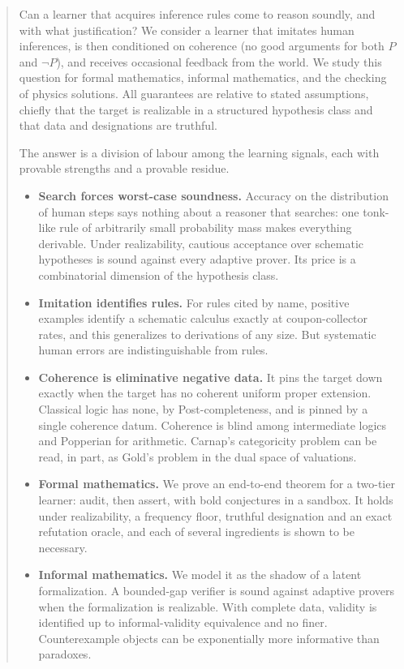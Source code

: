 \begin{abstract}
\noindent Can a learner that acquires inference rules come to reason soundly, and with what justification? We consider a learner that imitates human inferences, is then conditioned on coherence (no good arguments for both $P$ and $\neg P$), and receives occasional feedback from the world. We study this question for formal mathematics, informal mathematics, and the checking of physics solutions. All guarantees are relative to stated assumptions, chiefly that the target is realizable in a structured hypothesis class and that data and designations are truthful.

The answer is a division of labour among the learning signals, each with provable strengths and a provable residue.
\begin{itemize}
\item \textbf{Search forces worst-case soundness.} Accuracy on the distribution of human steps says nothing about a reasoner that searches: one tonk-like rule of arbitrarily small probability mass makes everything derivable. Under realizability, cautious acceptance over schematic hypotheses is sound against every adaptive prover. Its price is a combinatorial dimension of the hypothesis class.
\item \textbf{Imitation identifies rules.} For rules cited by name, positive examples identify a schematic calculus exactly at coupon-collector rates, and this generalizes to derivations of any size. But systematic human errors are indistinguishable from rules.
\item \textbf{Coherence is eliminative negative data.} It pins the target down exactly when the target has no coherent uniform proper extension. Classical logic has none, by Post-completeness, and is pinned by a single coherence datum. Coherence is blind among intermediate logics and Popperian for arithmetic. Carnap's categoricity problem can be read, in part, as Gold's problem in the dual space of valuations.
\item \textbf{Formal mathematics.} We prove an end-to-end theorem for a two-tier learner: audit, then assert, with bold conjectures in a sandbox. It holds under realizability, a frequency floor, truthful designation and an exact refutation oracle, and each of several ingredients is shown to be necessary.
\item \textbf{Informal mathematics.} We model it as the shadow of a latent formalization. A bounded-gap verifier is sound against adaptive provers when the formalization is realizable. With complete data, validity is identified up to informal-validity equivalence and no finer. Counterexample objects can be exponentially more informative than paradoxes.

\end{itemize}
\end{abstract}
